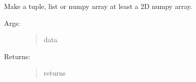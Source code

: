 \documentclass[letterpaper,10pt,english]{sphinxmanual}
\begin{document}
\begin{fulllineitems}
\label{\detokenize{utils:luxpy.utils.helpers.np2d}}
Make a tuple, list or numpy array at least a 2D numpy array.
\begin{description}
\item[{Args:}] \leavevmode\begin{quote}\begin{description}
\item[{data}] \leavevmode
{}

\end{description}\end{quote}

\item[{Returns:}] \leavevmode\begin{quote}\begin{description}
\item[{returns}] \leavevmode
{}

\end{description}\end{quote}

\end{description}

\end{fulllineitems}

\end{document}
